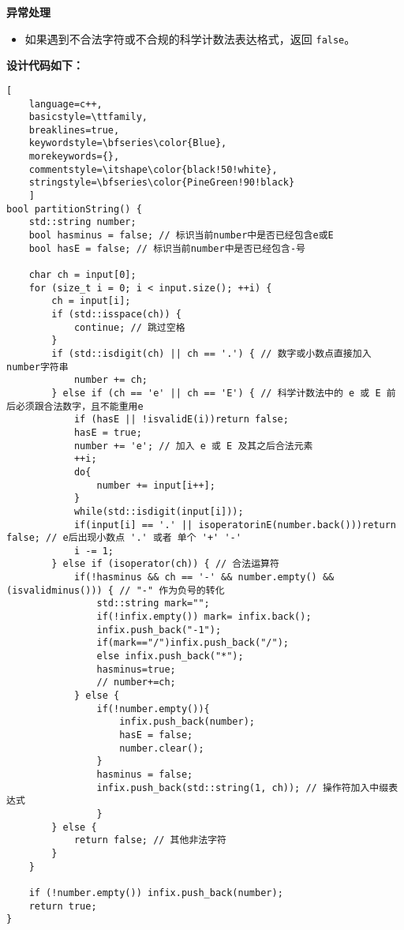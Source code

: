 \documentclass[UTF8]{ctexart}
\begin{document}
\textbf{异常处理}
\begin{itemize}
    \item 如果遇到不合法字符或不合规的科学计数法表达格式，返回 \texttt{false}。
\end{itemize}

\textbf{设计代码如下：}

\begin{lstlisting}[ 
    language=c++,
    basicstyle=\ttfamily,
    breaklines=true,
    keywordstyle=\bfseries\color{Blue}, 
    morekeywords={}, 
    commentstyle=\itshape\color{black!50!white},
    stringstyle=\bfseries\color{PineGreen!90!black} 
    ]
bool partitionString() {
    std::string number;
    bool hasminus = false; // 标识当前number中是否已经包含e或E
    bool hasE = false; // 标识当前number中是否已经包含-号

    char ch = input[0];
    for (size_t i = 0; i < input.size(); ++i) {
        ch = input[i];
        if (std::isspace(ch)) {
            continue; // 跳过空格
        }
        if (std::isdigit(ch) || ch == '.') { // 数字或小数点直接加入number字符串
            number += ch;
        } else if (ch == 'e' || ch == 'E') { // 科学计数法中的 e 或 E 前后必须跟合法数字，且不能重用e
            if (hasE || !isvalidE(i))return false;
            hasE = true;
            number += 'e'; // 加入 e 或 E 及其之后合法元素
            ++i;
            do{
                number += input[i++];
            }
            while(std::isdigit(input[i]));
            if(input[i] == '.' || isoperatorinE(number.back()))return false; // e后出现小数点 '.' 或者 单个 '+' '-'
            i -= 1;
        } else if (isoperator(ch)) { // 合法运算符
            if(!hasminus && ch == '-' && number.empty() && (isvalidminus())) { // "-" 作为负号的转化
                std::string mark="";
                if(!infix.empty()) mark= infix.back();
                infix.push_back("-1");
                if(mark=="/")infix.push_back("/");
                else infix.push_back("*");
                hasminus=true;
                // number+=ch;
            } else {
                if(!number.empty()){
                    infix.push_back(number);
                    hasE = false;
                    number.clear();
                }
                hasminus = false;
                infix.push_back(std::string(1, ch)); // 操作符加入中缀表达式
                } 
        } else {
            return false; // 其他非法字符
        }
    }

    if (!number.empty()) infix.push_back(number);
    return true;
}
\end{lstlisting}
\end{document}
